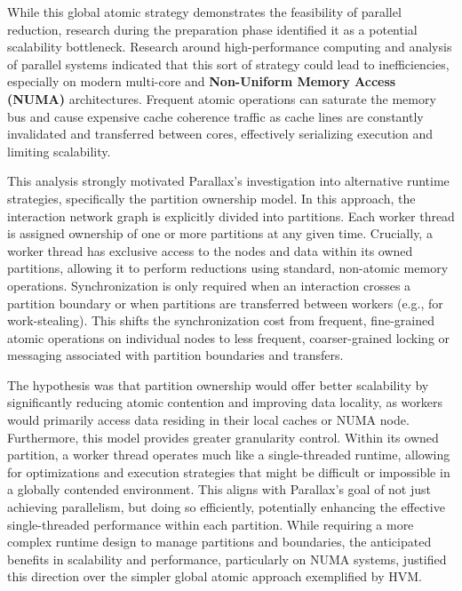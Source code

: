 While this global atomic strategy demonstrates the feasibility of parallel reduction, research during the preparation phase identified it as a potential scalability bottleneck. Research around high-performance computing and analysis of parallel systems indicated that this sort of strategy could lead to inefficiencies, especially on modern multi-core and \textbf{Non-Uniform Memory Access (NUMA)} architectures. Frequent atomic operations can saturate the memory bus and cause expensive cache coherence traffic as cache lines are constantly invalidated and transferred between cores, effectively serializing execution and limiting scalability.

This analysis strongly motivated Parallax's investigation into alternative runtime strategies, specifically the partition ownership model. In this approach, the interaction network graph is explicitly divided into partitions. Each worker thread is assigned ownership of one or more partitions at any given time. Crucially, a worker thread has exclusive access to the nodes and data within its owned partitions, allowing it to perform reductions using standard, non-atomic memory operations. Synchronization is only required when an interaction crosses a partition boundary or when partitions are transferred between workers (e.g., for work-stealing). This shifts the synchronization cost from frequent, fine-grained atomic operations on individual nodes to less frequent, coarser-grained locking or messaging associated with partition boundaries and transfers.

The hypothesis was that partition ownership would offer better scalability by significantly reducing atomic contention and improving data locality, as workers would primarily access data residing in their local caches or NUMA node. Furthermore, this model provides greater granularity control. Within its owned partition, a worker thread operates much like a single-threaded runtime, allowing for optimizations and execution strategies that might be difficult or impossible in a globally contended environment. This aligns with Parallax's goal of not just achieving parallelism, but doing so efficiently, potentially enhancing the effective single-threaded performance within each partition. While requiring a more complex runtime design to manage partitions and boundaries, the anticipated benefits in scalability and performance, particularly on NUMA systems, justified this direction over the simpler global atomic approach exemplified by HVM.

